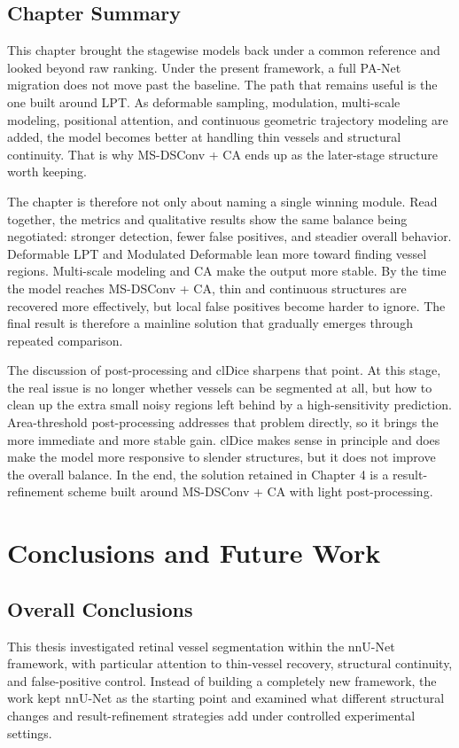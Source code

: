 \documentclass[a4paper,11pt]{article}
\begin{document}
\subsection{Chapter Summary}

This chapter brought the stagewise models back under a common reference and looked beyond raw ranking. Under the present framework, a full PA-Net migration does not move past the baseline. The path that remains useful is the one built around LPT. As deformable sampling, modulation, multi-scale modeling, positional attention, and continuous geometric trajectory modeling are added, the model becomes better at handling thin vessels and structural continuity. That is why MS-DSConv + CA ends up as the later-stage structure worth keeping.

The chapter is therefore not only about naming a single winning module. Read together, the metrics and qualitative results show the same balance being negotiated: stronger detection, fewer false positives, and steadier overall behavior. Deformable LPT and Modulated Deformable lean more toward finding vessel regions. Multi-scale modeling and CA make the output more stable. By the time the model reaches MS-DSConv + CA, thin and continuous structures are recovered more effectively, but local false positives become harder to ignore. The final result is therefore a mainline solution that gradually emerges through repeated comparison.

The discussion of post-processing and clDice sharpens that point. At this stage, the real issue is no longer whether vessels can be segmented at all, but how to clean up the extra small noisy regions left behind by a high-sensitivity prediction. Area-threshold post-processing addresses that problem directly, so it brings the more immediate and more stable gain. clDice makes sense in principle and does make the model more responsive to slender structures, but it does not improve the overall balance. In the end, the solution retained in Chapter 4 is a result-refinement scheme built around MS-DSConv + CA with light post-processing.

\section{Conclusions and Future Work}

\subsection{Overall Conclusions}
This thesis investigated retinal vessel segmentation within the nnU-Net framework, with particular attention to thin-vessel recovery, structural continuity, and false-positive control. Instead of building a completely new framework, the work kept nnU-Net as the starting point and examined what different structural changes and result-refinement strategies add under controlled experimental settings.
\end{document}
